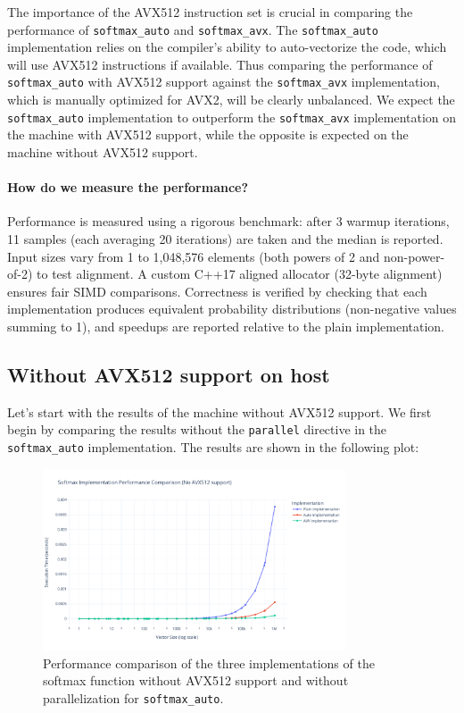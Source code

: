 \documentclass[10pt]{article}
\begin{document}
The importance of the AVX512 instruction set is crucial in comparing the performance of \texttt{softmax\_auto} and \texttt{softmax\_avx}. The \texttt{softmax\_auto} implementation relies on the compiler's ability to auto-vectorize the code, which will use AVX512 instructions if available. Thus comparing the performance of \texttt{softmax\_auto} with AVX512 support against the \texttt{softmax\_avx} implementation, which is manually optimized for AVX2, will be clearly unbalanced. We expect the \texttt{softmax\_auto} implementation to outperform the \texttt{softmax\_avx} implementation on the machine with AVX512 support, while the opposite is expected on the machine without AVX512 support.

\paragraph{How do we measure the performance?}
Performance is measured using a rigorous benchmark: after 3 warmup iterations, 11 samples (each averaging 20 iterations) are taken and the median is reported. Input sizes vary from 1 to 1,048,576 elements (both powers of 2 and non-power-of-2) to test alignment. A custom C++17 aligned allocator (32-byte alignment) ensures fair SIMD comparisons. Correctness is verified by checking that each implementation produces equivalent probability distributions (non-negative values summing to 1), and speedups are reported relative to the plain implementation.

\subsection{Without AVX512 support on host}
Let's start with the results of the machine without AVX512 support. We first begin by comparing the results without the \texttt{parallel} directive in the \texttt{softmax\_auto} implementation. The results are shown in the following plot:

\begin{figure}[H]
  \centering
  \includegraphics[width=0.8\textwidth]{../images/softmax_noparallel.pdf}
  \caption{Performance comparison of the three implementations of the softmax function without AVX512 support and without parallelization for \texttt{softmax\_auto}.}
  \label{fig:softmax_auto_no_parallel}
\end{figure}
\end{document}
